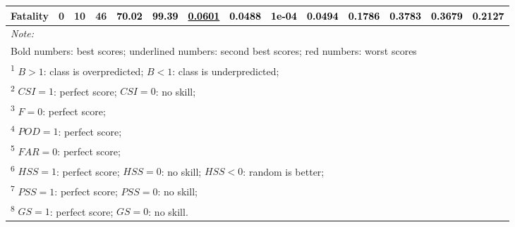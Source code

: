 \documentclass[]{elsarticle} %
\begin{document}
\begin{table}[!h]
{\begin{tabular}[t]{lrrrllllllllll}
Fatality & 0 & 10 & 46 & \multirow{-3}{*}{\raggedright\arraybackslash \textcolor{black}{70.02}} & \textcolor{black}{99.39} & \textcolor{black}{\underline{0.0601}} & \textcolor{black}{\textbf{0.0488}} & \textcolor{black}{\textbf{1e-04}} & \textcolor{black}{\textbf{0.0494}} & \textcolor{black}{\textbf{0.1786}} & \multirow{-3}{*}{\raggedright\arraybackslash \textcolor{black}{0.3783}} & \multirow{-3}{*}{\raggedright\arraybackslash \textcolor{black}{0.3679}} & \multirow{-3}{*}{\raggedright\arraybackslash \textcolor{black}{0.2127}}\\
\bottomrule
\multicolumn{14}{l}{\textit{Note: }}\\
\multicolumn{14}{l}{Bold numbers: best scores; underlined numbers: second best scores; red numbers: worst scores}\\
\multicolumn{14}{l}{\textsuperscript{1} $B>1$: class is overpredicted; $B<1$: class is underpredicted; }\\
\multicolumn{14}{l}{\textsuperscript{2} $CSI = 1$: perfect score; $CSI = 0$: no skill; }\\
\multicolumn{14}{l}{\textsuperscript{3} $F = 0$: perfect score; }\\
\multicolumn{14}{l}{\textsuperscript{4} $POD = 1$: perfect score; }\\
\multicolumn{14}{l}{\textsuperscript{5} $FAR = 0$: perfect score; }\\
\multicolumn{14}{l}{\textsuperscript{6} $HSS = 1$: perfect score; $HSS = 0$: no skill; $HSS < 0$: random is better; }\\
\multicolumn{14}{l}{\textsuperscript{7} $PSS = 1$: perfect score; $PSS = 0$: no skill; }\\
\multicolumn{14}{l}{\textsuperscript{8} $GS = 1$: perfect score; $GS = 0$: no skill.}\\
\end{tabular}}
\end{table}
\end{document}
